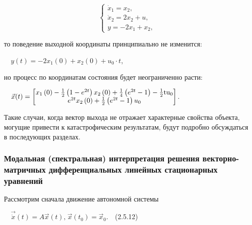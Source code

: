 \documentclass[a4paper]{article}
\newcommand\normalsubformula[1]{\text{\mathversion{normal}$#1$}}
\begin{document}
\begin{equation*}
\left\{\begin{matrix}\dot x_1=x_2,\\\dot x_2=2x_2+u,\\y=-2x_1+x_2,\end{matrix}\right.
\end{equation*}

\bigskip

{\begin{russian}\sffamily
то поведение выходной координаты принципиально не изменится:
\end{russian}}

{\begin{russian}\sffamily
\ \  $y(t)=-2x_1(0)+x_2(0)+u_0\cdot t$,
\end{russian}}

{\begin{russian}\sffamily
но процесс по координатам состояния будет неограниченно расти:
\end{russian}}

{\begin{russian}\sffamily
\ \  $\vec x(t)=\left[\begin{matrix}x_1\left(0\right)-\frac 1 2\left(1-e^{2t}\right)x_2\left(0\right)+\frac 1
4\left(e^{2t}-1\right)-\frac 1 2\normalsubformula{\text{tu}}_0\\e^{2t}x_2\left(0\right)+\frac 1
2\left(e^{2t}-1\right)u_0\end{matrix}\right]$.
\end{russian}}

{\begin{russian}\sffamily
Такие случаи, когда вектор выхода не отражает характерные свойства объекта, могущие привести к катастрофическим
результатам, будут подробно обсуждаться в последующих разделах.
\end{russian}}


\bigskip

\subsubsection{Модальная (спектральная) интерпретация решения векторно-матричных дифференциальных линейных стационарных
уравнений}
\hypertarget{RefHeadingToc455659707}{}{\begin{russian}\sffamily
Рассмотрим сначала движение автономной системы
\end{russian}}

{\begin{russian}\sffamily
\ \  $\vec{\dot x}\left(t\right)=A\vec x(t),_{}^{}_{}^{}\vec x\left(t_0\right)=\vec x_0$.\ \ (2.5.12)
\end{russian}}
\end{document}

